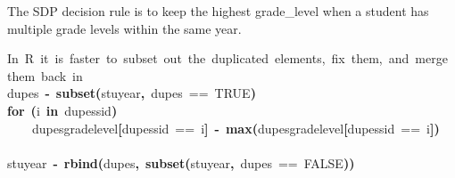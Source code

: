 \documentclass[12pt]{article}
\makeatletter
\newcommand{\hlnumber}[1]{\textcolor[rgb]{0,0,0}{#1}}%
\newcommand{\hlfunctioncall}[1]{\textcolor[rgb]{0.501960784313725,0,0.329411764705882}{\textbf{#1}}}%
\newcommand{\hlkeyword}[1]{\textcolor[rgb]{0,0,0}{\textbf{#1}}}%
\newcommand{\hlcomment}[1]{\textcolor[rgb]{0.180392156862745,0.6,0.341176470588235}{#1}}%
\newcommand{\hlassignement}[1]{\textcolor[rgb]{0,0,0}{\textbf{#1}}}%
\newcommand{\hlsymbol}[1]{\textcolor[rgb]{0,0,0}{#1}}%
\newcommand{\hlstd}[1]{\textcolor[rgb]{0,0,0}{#1}}%
\newenvironment{kframe}{%
 \def\FrameCommand##1{\hskip\@totalleftmargin \hskip-\fboxsep
 \colorbox{shadecolor}{##1}\hskip-\fboxsep
     \hskip-\linewidth \hskip-\@totalleftmargin \hskip\columnwidth}%
 \MakeFramed {\advance\hsize-\width
   \@totalleftmargin\z@ \linewidth\hsize
   \@setminipage}}%
 {\par\unskip\endMakeFramed}
\newenvironment{knitrout}{}{} %
\renewenvironment{knitrout}{\begin{footnotesize}}{\end{footnotesize}}
\makeatother
\begin{document}
The SDP decision rule is to keep the highest grade\_level when a student has multiple 
grade levels within the same year.

\begin{knitrout}
\color{fgcolor}\begin{kframe}
\begin{flushleft}
\ttfamily\noindent
\hlcomment{\usebox{\hlnormalsizeboxhash}{\ }In{\ }R{\ }it{\ }is{\ }faster{\ }to{\ }subset{\ }out{\ }the{\ }duplicated{\ }elements,{\ }fix{\ }them,{\ }and{\ }merge}\hspace*{\fill}\\
\hlstd{}\hlcomment{\usebox{\hlnormalsizeboxhash}{\ }them{\ }back{\ }in}\hspace*{\fill}\\
\hlstd{}\hlsymbol{dupes}{\ }\hlassignement{\usebox{\hlnormalsizeboxlessthan}-}{\ }\hlfunctioncall{subset}\hlkeyword{(}\hlsymbol{stuyear}\hlkeyword{,}{\ }\hlsymbol{dupes}{\ }=={\ }\hlnumber{TRUE}\hlkeyword{)}\hspace*{\fill}\\
\hlstd{}\hlkeyword{for}{\ }\hlkeyword{(}\hlsymbol{i}{\ }\hlkeyword{in}{\ }\hlsymbol{dupes}\hlkeyword{\usebox{\hlnormalsizeboxdollar}}\hlsymbol{sid}\hlkeyword{)}{\ }\hlkeyword{\usebox{\hlnormalsizeboxopenbrace}}\hspace*{\fill}\\
\hlstd{}{\ }{\ }{\ }{\ }\hlsymbol{dupes}\hlkeyword{\usebox{\hlnormalsizeboxdollar}}\hlsymbol{grade\usebox{\hlnormalsizeboxunderscore}level}\hlkeyword{[}\hlsymbol{dupes}\hlkeyword{\usebox{\hlnormalsizeboxdollar}}\hlsymbol{sid}{\ }=={\ }\hlsymbol{i}\hlkeyword{]}{\ }\hlassignement{\usebox{\hlnormalsizeboxlessthan}-}{\ }\hlfunctioncall{max}\hlkeyword{(}\hlsymbol{dupes}\hlkeyword{\usebox{\hlnormalsizeboxdollar}}\hlsymbol{grade\usebox{\hlnormalsizeboxunderscore}level}\hlkeyword{[}\hlsymbol{dupes}\hlkeyword{\usebox{\hlnormalsizeboxdollar}}\hlsymbol{sid}{\ }=={\ }\hlsymbol{i}\hlkeyword{]}\hlkeyword{)}\hspace*{\fill}\\
\hlstd{}\hlkeyword{\usebox{\hlnormalsizeboxclosebrace}}\hspace*{\fill}\\
\hlstd{}\hlsymbol{stuyear}{\ }\hlassignement{\usebox{\hlnormalsizeboxlessthan}-}{\ }\hlfunctioncall{rbind}\hlkeyword{(}\hlsymbol{dupes}\hlkeyword{,}{\ }\hlfunctioncall{subset}\hlkeyword{(}\hlsymbol{stuyear}\hlkeyword{,}{\ }\hlsymbol{dupes}{\ }=={\ }\hlnumber{FALSE}\hlkeyword{)}\hlkeyword{)}\hspace*{\fill}\\

\end{flushleft}
\end{kframe}
\end{knitrout}
\end{document}
